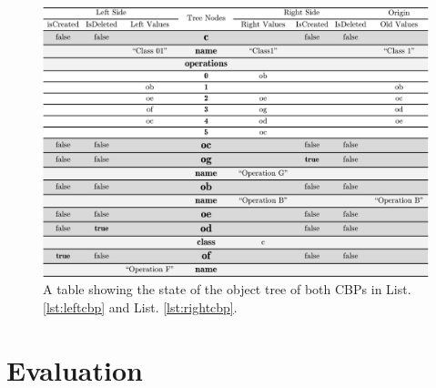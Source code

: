 \documentclass{llncs}
\begin{document}
\begin{figure}
    \includegraphics[width=\linewidth]{images/TreeTableCropped}
    \caption{A table showing the state of the object tree of both CBPs in List. \ref{lst:leftcbp} and List. \ref{lst:rightcbp}.}
    \label{fig:class_diagram}
\end{figure}



\section{Evaluation}
\label{sec:evaluation}
\end{document}
